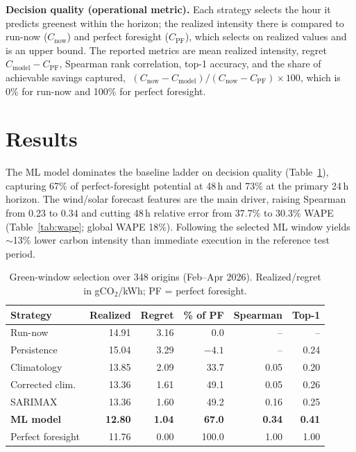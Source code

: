 \documentclass[10pt,a4paper]{article}
\begin{document}
\textbf{Decision quality (operational metric).} Each strategy selects the hour it
predicts greenest within the horizon; the realized intensity there is compared to
run-now ($C_{\text{now}}$) and perfect foresight ($C_{\text{PF}}$), which selects
on realized values and is an upper bound. The reported metrics are mean realized intensity, regret
$C_{\text{model}}-C_{\text{PF}}$, Spearman rank correlation, top-1 accuracy, and
the share of achievable savings captured,
$\;(C_{\text{now}}-C_{\text{model}})/(C_{\text{now}}-C_{\text{PF}})\times 100$,
which is 0\% for run-now and 100\% for perfect foresight.

\section{Results}
The ML model dominates the baseline ladder on decision quality
(Table~\ref{tab:decision}), capturing 67\% of perfect-foresight potential at
48\,h and 73\% at the primary 24\,h horizon. The wind/solar forecast features are
the main driver, raising Spearman from 0.23 to 0.34 and cutting 48\,h relative
error from 37.7\% to 30.3\% WAPE (Table~\ref{tab:wape}; global WAPE 18\%).
Following the selected ML window yields $\sim$13\% lower carbon intensity than
immediate execution in the reference test period.

\begin{table}[h]\centering\small
\caption{Green-window selection over 348 origins (Feb--Apr 2026). Realized/regret
in gCO$_2$/kWh; PF = perfect foresight.}
\label{tab:decision}
\begin{tabular}{@{}lrrrrr@{}}
\toprule
Strategy & Realized & Regret & \% of PF & Spearman & Top-1 \\
\midrule
Run-now              & 14.91 & 3.16 & 0.0   & --   & --   \\
Persistence          & 15.04 & 3.29 & $-4.1$& --   & 0.24 \\
Climatology          & 13.85 & 2.09 & 33.7  & 0.05 & 0.20 \\
Corrected clim.      & 13.36 & 1.61 & 49.1  & 0.05 & 0.26 \\
SARIMAX              & 13.36 & 1.60 & 49.2  & 0.16 & 0.25 \\
\textbf{ML model} & \textbf{12.80} & \textbf{1.04} & \textbf{67.0} & \textbf{0.34} & \textbf{0.41} \\
Perfect foresight    & 11.76 & 0.00 & 100.0 & 1.00 & 1.00 \\
\bottomrule
\end{tabular}
\end{table}
\end{document}
